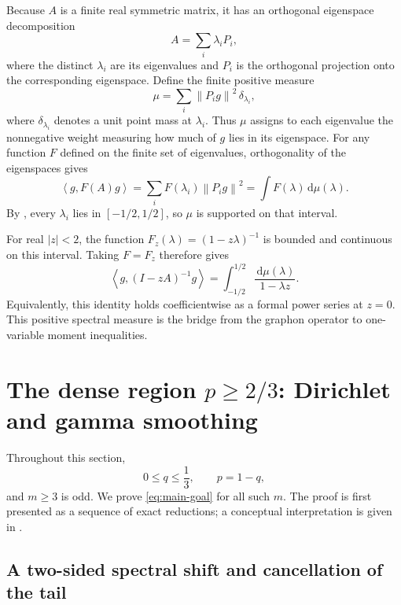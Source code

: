 \documentclass[11pt]{article}
\newcommand{\ip}[2]{\left\langle #1,#2\right\rangle}
\newcommand{\norm}[1]{\left\lVert #1\right\rVert}
\newcommand{\dd}{\,\mathrm d}
\begin{document}
Because \(A\) is a finite real symmetric matrix, it has an orthogonal
eigenspace decomposition
\[
       A=\sum_i\lambda_iP_i,
\]
where the distinct \(\lambda_i\) are its eigenvalues and \(P_i\) is the
orthogonal projection onto the corresponding eigenspace.  Define the finite
positive measure
\begin{equation}\label{eq:mu-def}
       \mu=\sum_i\norm{P_i g}^2\,\delta_{\lambda_i},
\end{equation}
where \(\delta_{\lambda_i}\) denotes a unit point mass at \(\lambda_i\).
Thus \(\mu\) assigns to each
eigenvalue the nonnegative weight measuring how much of \(g\) lies in its
eigenspace.  For any function \(F\) defined on the finite set of eigenvalues,
orthogonality of the eigenspaces gives
\[
       \ip g{F(A)g}
       =\sum_i F(\lambda_i)\norm{P_i g}^2
       =\int F(\lambda)\dd\mu(\lambda).
\]
By , every \(\lambda_i\) lies in
\([-1/2,1/2]\), so \(\mu\) is supported on that interval.

For real \(|z|<2\), the function
\(F_z(\lambda)=(1-z\lambda)^{-1}\) is bounded and continuous on this
interval.  Taking \(F=F_z\) therefore gives
\begin{equation}\label{eq:resolvents-common}
 \ip g{(I-zA)^{-1}g}
 =\int_{-1/2}^{1/2}\frac{\dd\mu(\lambda)}{1-\lambda z}.
\end{equation}
Equivalently, this identity holds coefficientwise as a formal power series
at \(z=0\).
This positive spectral measure is the bridge from the graphon operator to
one-variable moment inequalities.

\section{The dense region \texorpdfstring{\(p\ge2/3\)}{p>=2/3}: Dirichlet and gamma smoothing}
\label{sec:dense-region}

Throughout this section,
\begin{equation}\label{eq:dense-q}
       0\le q\le\frac13,
       \qquad p=1-q,
\end{equation}
and \(m\ge3\) is odd.  We prove \eqref{eq:main-goal} for all such \(m\).
The proof is first presented as a sequence of exact reductions; a conceptual
interpretation is given in .

\subsection{A two-sided spectral shift and cancellation of the tail}
\end{document}
